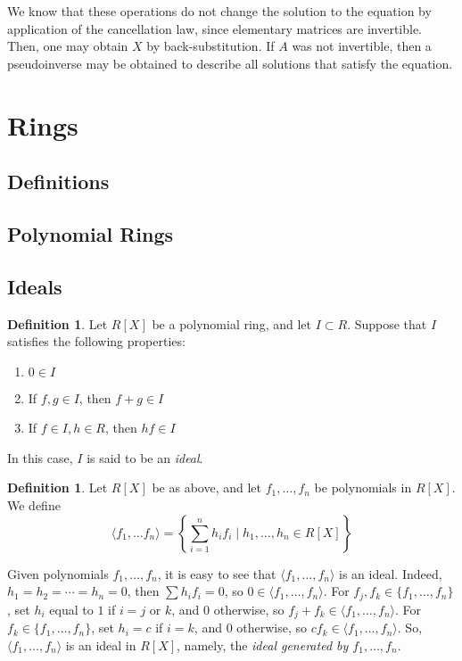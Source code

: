 \documentclass{amsart}
\theoremstyle{definition}
\newtheorem{definition}[theorem]{Definition}
\theoremstyle{remark}
\numberwithin{equation}{section}
\begin{document}
    We know that these operations do not change the solution to the equation by application of the cancellation law, since elementary matrices are invertible. Then, one may obtain $X$ by back-substitution. If $A$ was not invertible, then a pseudoinverse may be obtained to describe all solutions that satisfy the equation.

\section{Rings}
\label{seq:rings}

\subsection{Definitions}

\subsection{Polynomial Rings}

\subsection{Ideals}

\begin{definition}
  Let $R[X]$ be a polynomial ring, and let $I \subset R$. Suppose that $I$ satisfies the following properties:
  \begin{enumerate}[i]
  \item $0 \in I$
  \item If $f, g \in I$, then $f + g \in I$
  \item If $f \in I, h \in R$, then $hf \in I$
  \end{enumerate}
  In this case, $I$ is said to be an \emph{ideal}.
\end{definition}

\begin{definition}
  Let $R[X]$ be as above, and let $f_1, \ldots, f_n$ be polynomials in $R[X]$. We define
  \begin{equation*}
    \langle f_1, \ldots f_n \rangle = \left\{ \sum_{i = 1}^n h_i f_i \mid h_1, \ldots, h_n \in R[X] \right\}
  \end{equation*}
\end{definition}

Given polynomials $f_1, \ldots, f_n$, it is easy to see that $\langle f_1, \ldots, f_n \rangle$ is an ideal. Indeed, $h_1 = h_2 = \cdots = h_n = 0$, then $\sum h_i f_i = 0$, so $0 \in \langle f_1, \ldots, f_n \rangle$. For $f_j, f_k \in \{ f_1, \ldots, f_n \}$, set $h_i$ equal to $1$ if $i = j$ or $k$, and $0$ otherwise, so $f_j + f_k \in \langle f_1, \ldots, f_n \rangle$. For $f_k \in \{ f_1, \ldots, f_n \}$, set $h_i = c$ if $i = k$, and $0$ otherwise, so $c f_k \in \langle f_1, \ldots, f_n \rangle$. So, $\langle f_1, \ldots, f_n \rangle$ is an ideal in $R[X]$, namely, the \emph{ideal generated by $f_1, \ldots, f_n$}.
\end{document}
